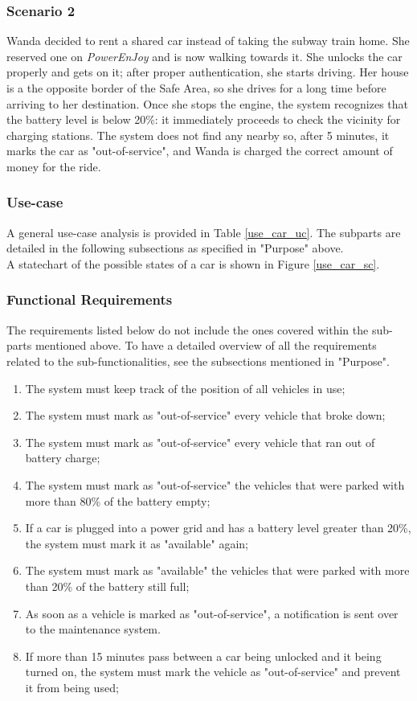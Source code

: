 \subsubsection{Scenario 2}
Wanda decided to rent a shared car instead of taking the subway train home. She reserved one on \emph{PowerEnJoy} and is now walking towards it. She unlocks the car properly and gets on it; after proper authentication, she starts driving. Her house is a the opposite border of the Safe Area, so she drives for a long time before arriving to her destination. Once she stops the engine, the system recognizes that the battery level is below 20\%: it immediately proceeds to check the vicinity for charging stations. The system does not find any nearby so, after 5 minutes, it marks the car as "out-of-service", and Wanda is charged the correct amount of money for the ride.

\subsubsection{Use-case}
A general use-case analysis is provided in Table \ref{use_car_uc}. The subparts are detailed in the following subsections as specified in "Purpose" above. \\
A statechart of the possible states of a car is shown in Figure \ref{use_car_sc}.

\subsubsection{Functional Requirements}
The requirements listed below do not include the ones covered within the sub-parts mentioned above. To have a detailed overview of all the requirements related to the sub-functionalities, see the subsections mentioned in "Purpose".

\begin{enumerate}
\item The system must keep track of the position of all vehicles in use;
\item The system must mark as "out-of-service" every vehicle that broke down;
\item The system must mark as "out-of-service" every vehicle that ran out of battery charge;
\item The system must mark as "out-of-service" the vehicles that were parked with more than 80\% of the battery empty;
\item If a car is plugged into a power grid and has a battery level greater than 20\%, the system must mark it as "available" again;
\item The system must mark as "available" the vehicles that were parked with more than 20\% of the battery still full;
\item As soon as a vehicle is marked as "out-of-service", a notification is sent over to the maintenance system.
\item If more than 15 minutes pass between a car being unlocked and it being turned on, the system must mark the vehicle as "out-of-service" and prevent it from being used;
\end{enumerate}


